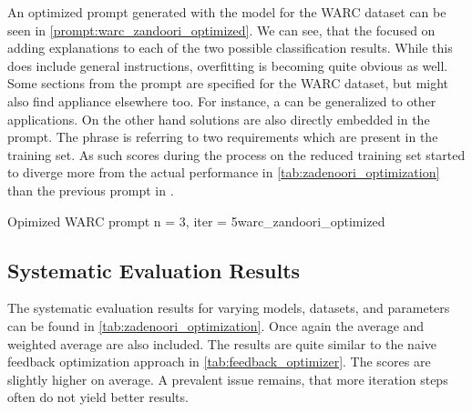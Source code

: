 An optimized prompt generated with the \gpt model for the WARC dataset can be seen in \autoref{prompt:warc_zandoori_optimized}.
We can see, that the \LLM focused on adding explanations to each of the two possible classification results.
While this does include general instructions, overfitting is becoming quite obvious as well.
Some sections from the prompt are specified for the WARC dataset, but might also find appliance elsewhere too.
For instance, a  can be generalized to other applications.
On the other hand solutions are also directly embedded in the prompt.
The phrase  is referring to two requirements which are present in the training set.
As such \fone scores during the \APE process on the reduced training set started to diverge more from the actual performance in \autoref{tab:zadenoori_optimization} than the previous prompt in .

\begin{prompt}{Opimized WARC prompt n = 3, iter = 5}{warc_zandoori_optimized}
    \\
    
\end{prompt}

\subsection{Systematic Evaluation Results}
\label{subsec:Evaluation:varying-the-optimization-prompt:systematic-evaluation-results}

The systematic evaluation results for varying models, datasets, and parameters can be found in \autoref{tab:zadenoori_optimization}.
Once again the average and weighted average are also included.
The results are quite similar to the naive feedback optimization approach in \autoref{tab:feedback_optimizer}.
The \fone scores are slightly higher on average.
A prevalent issue remains, that more iteration steps often do not yield better results.

\begin{table}
    \centering
    \renewcommand{\arraystretch}{1.4}
    
    \renewcommand{\arraystretch}{1}
    \caption{Naive prompt optimization approach using the optimization prompt by }
    \label{tab:zadenoori_optimization}
\end{table}